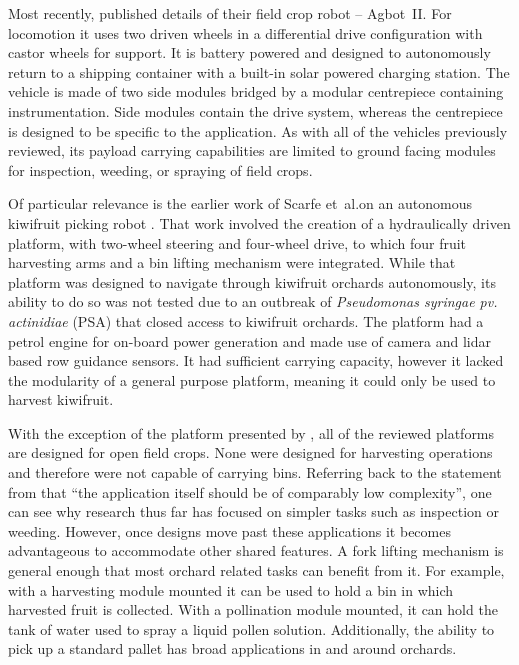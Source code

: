 \documentclass[preprint,authoryear,12pt]{elsarticle}
\begin{document}
        Most recently, \cite{Bawden2017} published details of their field crop robot -- Agbot~II.
        For locomotion it uses two driven wheels in a differential drive configuration with castor wheels for support.
        It is battery powered and designed to autonomously return to a shipping container with a built-in solar powered charging station.
        The vehicle is made of two side modules bridged by a modular centrepiece containing instrumentation.
        Side modules contain the drive system, whereas the centrepiece is designed to be specific to the application.
        As with all of the vehicles previously reviewed, its payload carrying capabilities are limited to ground facing modules for inspection, weeding, or spraying of field crops.


        Of particular relevance is the earlier work of Scarfe et~al.\@ on an autonomous kiwifruit picking robot \citep{scarfe2009, Scarfe2012}.
        That work involved the creation of a hydraulically driven platform, with two-wheel steering and four-wheel drive, to which four fruit harvesting arms and a bin lifting mechanism were integrated.
        While that platform was designed to navigate through kiwifruit orchards autonomously, its ability to do so was not tested due to an outbreak of \textit{Pseudomonas syringae pv. actinidiae} (PSA) that closed access to kiwifruit orchards.
        The platform had a petrol engine for on-board power generation and made use of camera and lidar based row guidance sensors.
        It had sufficient carrying capacity, however it lacked the modularity of a general purpose platform, meaning it could only be used to harvest kiwifruit.

        With the exception of the platform presented by \cite{Scarfe2012}, all of the reviewed platforms are designed for open field crops.
        None were designed for harvesting operations and therefore were not capable of carrying bins.
        Referring back to the statement from \cite{Ruckelshausen2009} that ``the application itself should be of comparably low complexity'', one can see why research thus far has focused on simpler tasks such as inspection or weeding.
        However, once designs move past these applications it becomes advantageous to accommodate other shared features.
        A fork lifting mechanism is general enough that most orchard related tasks can benefit from it.
        For example, with a harvesting module mounted it can be used to hold a bin in which harvested fruit is collected.
        With a pollination module mounted, it can hold the tank of water used to spray a liquid pollen solution.
        Additionally, the ability to pick up a standard pallet has broad applications in and around orchards.
\end{document}
